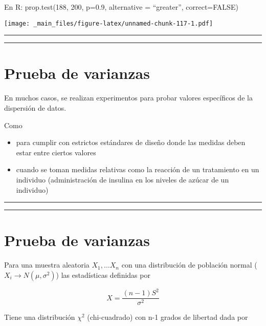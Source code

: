 \documentclass[
]{book}
\providecommand{\tightlist}{%
  \setlength{\itemsep}{0pt}\setlength{\parskip}{0pt}}
\begin{document}
En R: prop.test(188, 200, p=0.9, alternative = ``greater'', correct=FALSE)

\texttt{[image: \_main\_files/figure-latex/unnamed-chunk-117-1.pdf]}

\begin{center}\rule{0.5\linewidth}{0.5pt}\end{center}

\begin{center}\rule{0.5\linewidth}{0.5pt}\end{center}

\hypertarget{prueba-de-varianzas}{%
\section{Prueba de varianzas}\label{prueba-de-varianzas}}

En muchos casos, se realizan experimentos para probar valores específicos de la dispersión de datos.

Como

\begin{itemize}
\tightlist
\item
  para cumplir con estrictos estándares de diseño donde las medidas deben estar entre ciertos valores
\item
  cuando se toman medidas relativas como la reacción de un tratamiento en un individuo (administración de insulina en los niveles de azúcar de un individuo)
\end{itemize}

\begin{center}\rule{0.5\linewidth}{0.5pt}\end{center}

\begin{center}\rule{0.5\linewidth}{0.5pt}\end{center}

\hypertarget{prueba-de-varianzas-1}{%
\section{Prueba de varianzas}\label{prueba-de-varianzas-1}}

Para una muestra aleatoria \(X_1,...X_n\) con una distribución de población normal (\(X_i \rightarrow N(\mu, \sigma^2)\)) las estadísticas definidas por

\[X=\frac{(n-1)S^2}{\sigma^2}\]

Tiene una distribución \(\chi^2\) (chi-cuadrado) con n-1 grados de libertad dada por
\end{document}
